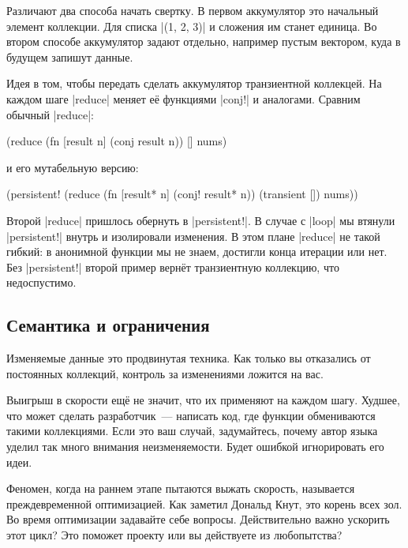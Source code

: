 Различают два способа начать свертку. В первом аккумулятор это начальный
элемент коллекции. Для списка \spverb|(1, 2, 3)| и сложения им станет
единица. Во втором способе аккумулятор задают отдельно, например пустым вектором, куда в
будущем запишут данные.

Идея в том, чтобы передать сделать аккумулятор транзиентной коллекцей. На каждом
шаге \spverb|reduce| меняет е\"{е} функциями \spverb|conj!| и аналогами. Сравним
обычный \spverb|reduce|:

\begin{english}
  \begin{clojure}
(reduce
 (fn [result n]
   (conj result n))
 []
 nums)
  \end{clojure}
\end{english}

\noindent
и его мутабельную версию:

\begin{english}
  \begin{clojure}
(persistent!
 (reduce
  (fn [result* n]
    (conj! result* n))
  (transient [])
  nums))
  \end{clojure}
\end{english}

Второй \spverb|reduce| пришлось обернуть в \spverb|persistent!|. В случае с
\spverb|loop| мы втянули \spverb|persistent!| внутрь и изолировали изменения. В
этом плане \spverb|reduce| не такой гибкий: в анонимной функции мы не знаем,
достигли конца итерации или нет. Без \spverb|persistent!| второй пример верн\"{е}т
транзиентную коллекцию, что недоспустимо.

\subsection{Семантика и ограничения}

Изменяемые данные это продвинутая техника. Как только вы отказались от
постоянных коллекций, контроль за изменениями ложится на вас.

Выигрыш в скорости ещ\"{е} не значит, что их применяют на каждом шагу. Худшее, что
может сделать разработчик~--- написать код, где функции обмениваются такими
коллекциями. Если это ваш случай, задумайтесь, почему автор языка уделил так
много внимания неизменяемости. Будет ошибкой игнорировать его идеи.


Феномен, когда на раннем этапе пытаются выжать скорость, называется
преждевременной оптимизацией. Как заметил Дональд Кнут, это корень всех зол. Во
время оптимизации задавайте себе вопросы. Действительно важно ускорить этот
цикл? Это поможет проекту или вы действуете из любопытства?

